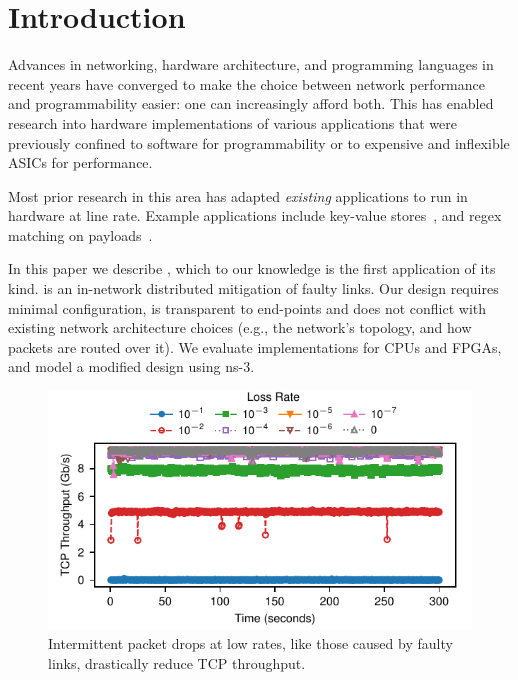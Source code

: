 \section{Introduction}
Advances in networking, hardware architecture, and programming
languages in recent years have converged to make the choice between
network performance and programmability easier: one can increasingly
afford both.
This has enabled research into hardware implementations of various
applications that were previously confined to software for
programmability or to expensive and inflexible ASICs for performance.

Most prior research in this area has adapted \emph{existing}
applications to run in hardware at line rate.
Example applications include
key-value stores~\cite{Li:2017:KHI:3132747.3132756},
and regex matching on payloads~\cite{Woods:2010:CED:1920841.1920926}.

In this paper we describe \OurSys, which to our knowledge is the first application
of its kind. \OurSys is an in-network distributed
mitigation of faulty links.
Our design requires
minimal configuration, is transparent to
end-points and does not conflict
with existing network architecture choices (e.g., the network's topology,
and how packets are routed over it).
We evaluate implementations for CPUs and FPGAs, and model a modified
design using ns-3.


\begin{figure}
  \centering
  \includegraphics[width=0.3\paperwidth]{figures/timeVsTput.pdf}
  \caption{\label{fig:timeVsTput} Intermittent packet drops at low rates, like those 
  caused by faulty links, drastically reduce TCP throughput.}
\end{figure}


